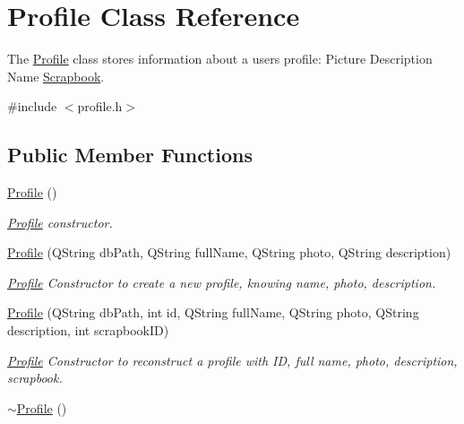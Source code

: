 \hypertarget{classProfile}{}\section{Profile Class Reference}
\label{classProfile}


The \hyperlink{classProfile}{Profile} class stores information about a user\textquotesingle{}s profile\+: Picture Description Name \hyperlink{classScrapbook}{Scrapbook}.  




{\ttfamily \#include $<$profile.\+h$>$}

\subsection*{Public Member Functions}
\begin{DoxyCompactItemize}
\item 
\hyperlink{classProfile_a4eea708cdbed0262d9e7ddbe3f1e3f89}{Profile} ()\hypertarget{classProfile_a4eea708cdbed0262d9e7ddbe3f1e3f89}{}\label{classProfile_a4eea708cdbed0262d9e7ddbe3f1e3f89}

\begin{DoxyCompactList}\small\item\em \hyperlink{classProfile}{Profile} constructor. \end{DoxyCompactList}\item 
\hyperlink{classProfile_a856fc2cd9f74a21194e31510b6e303e1}{Profile} (Q\+String db\+Path, Q\+String full\+Name, Q\+String photo, Q\+String description)
\begin{DoxyCompactList}\small\item\em \hyperlink{classProfile}{Profile} Constructor to create a new profile, knowing name, photo, description. \end{DoxyCompactList}\item 
\hyperlink{classProfile_a7d59ec57ad89453232ff87d9e004e495}{Profile} (Q\+String db\+Path, int id, Q\+String full\+Name, Q\+String photo, Q\+String description, int scrapbook\+ID)
\begin{DoxyCompactList}\small\item\em \hyperlink{classProfile}{Profile} Constructor to reconstruct a profile with ID, full name, photo, description, scrapbook. \end{DoxyCompactList}\item 
\hyperlink{classProfile_a58fa758a59bc4ee3c1a9980e360e4e98}{$\sim$\+Profile} ()\hypertarget{classProfile_a58fa758a59bc4ee3c1a9980e360e4e98}{}\label{classProfile_a58fa758a59bc4ee3c1a9980e360e4e98}


\end{DoxyCompactItemize}
